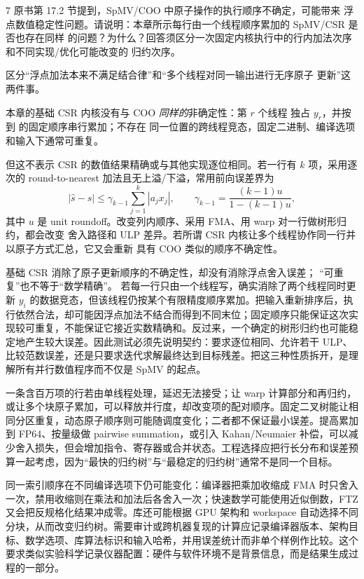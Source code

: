 \begin{solutionexercise}{7}
\problemheading 原书第 17.2 节提到，SpMV/COO 中原子操作的执行顺序不确定，可能带来
浮点数值稳定性问题。请说明：本章所示每行由一个线程顺序累加的 SpMV/CSR 是否也存在同样
的问题？为什么？回答须区分一次固定内核执行中的行内加法次序和不同实现/优化可能改变的
归约次序。

\approachheading 区分“浮点加法本来不满足结合律”和“多个线程对同一输出进行无序原子
更新”这两件事。

\answerheading 本章的基础 CSR 内核没有与 COO \emph{同样的}非确定性：第 $r$ 个线程
独占 $y_r$，并按  到  的固定顺序串行累加；不存在
同一位置的跨线程竞态，固定二进制、编译选项和输入下通常可重复。

但这不表示 CSR 的数值结果精确或与其他实现逐位相同。若一行有 $k$ 项，采用逐次的
round-to-nearest 加法且无上溢/下溢，常用前向误差界为
\[
 |\widehat{s}-s|\le \gamma_{k-1}\sum_{j=1}^{k}|a_jx_j|,
 \qquad
 \gamma_{k-1}=\frac{(k-1)u}{1-(k-1)u},
\]
其中 $u$ 是 unit roundoff。改变列内顺序、采用 FMA、用 warp 对一行做树形归约，都会改变
舍入路径和 ULP 差异。若所谓 CSR 内核让多个线程协作同一行并以原子方式汇总，它又会重新
具有 COO 类似的顺序不确定性。

\conclusionheading 基础 CSR 消除了原子更新顺序的不确定性，却没有消除浮点舍入误差；
“可重复”也不等于“数学精确”。
\discussionheading
{}
若每一行只由一个线程写，确实消除了两个线程同时更新 $y_i$ 的数据竞态，但该线程仍按某个有限精度顺序累加。把输入重新排序后，执行依然合法，却可能因浮点加法不结合而得到不同末位；固定顺序只能保证这次实现较可重复，不能保证它接近实数精确和。反过来，一个确定的树形归约也可能稳定地产生较大误差。因此测试必须先说明契约：要求逐位相同、允许若干 ULP、比较范数误差，还是只要求迭代求解最终达到目标残差。把这三种性质拆开，是理解所有并行数值程序而不仅是 SpMV 的起点。

一条含百万项的行若由单线程处理，延迟无法接受；让 warp 计算部分和再归约，或让多个块原子累加，可以释放并行度，却改变项的配对顺序。固定二叉树能让相同分区重复，动态原子顺序则可能随调度变化；二者都不保证最小误差。提高累加到 FP64、按量级做 pairwise summation，或引入 Kahan/Neumaier 补偿，可以减少舍入损失，但会增加指令、寄存器或合并状态。工程选择应把行长分布和误差预算一起考虑，因为“最快的归约树”与“最稳定的归约树”通常不是同一个目标。

同一索引顺序在不同编译选项下仍可能变化：编译器把乘加收缩成 FMA 时只舍入一次，禁用收缩则在乘法和加法后各舍入一次；快速数学可能使用近似倒数，FTZ 又会把反规格化结果冲成零。库还可能根据 GPU 架构和 workspace 自动选择不同分块，从而改变归约树。需要审计或跨机器复现的计算应记录编译器版本、架构目标、数学选项、库算法标识和输入哈希，并用误差统计而非单个样例作比较。这个要求类似实验科学记录仪器配置：硬件与软件环境不是背景信息，而是结果生成过程的一部分。


\end{solutionexercise}
